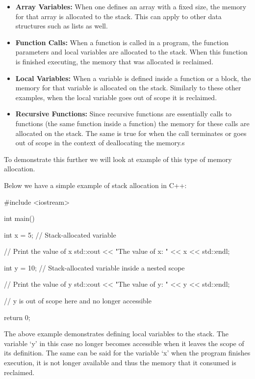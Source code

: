 \begin{itemize}
    \item \textbf{Array Variables:} When one defines an array with a fixed size, the memory for that array is allocated to the stack. This can apply to other data structures such as lists as well.
    \item \textbf{Function Calls:} When a function is called in a program, the function parameters and local variables are allocated to the stack. When this function is finished executing, the memory that
    was allocated is reclaimed.
    \item \textbf{Local Variables:} When a variable is defined inside a function or a block, the memory for that variable is allocated on the stack. Similarly to these other examples, when the local variable
    goes out of scope it is reclaimed.
    \item \textbf{Recursive Functions:} Since recursive functions are essentially calls to functions (the same function inside a function) the memory for these calls are allocated on the stack. The same is true
    for when the call terminates or goes out of scope in the context of deallocating the memory.s
\end{itemize}

\noindent To demonstrate this further we will look at example of this type of memory allocation.

\begin{highlight}

Below we have a simple example of stack allocation in C++:

\begin{code}
#include <iostream>

int main() {
    int x = 5;  // Stack-allocated variable

    // Print the value of x
    std::cout << "The value of x: " << x << std::endl;

    {
        int y = 10;  // Stack-allocated variable inside a nested scope

        // Print the value of y
        std::cout << "The value of y: " << y << std::endl;
    }

    // y is out of scope here and no longer accessible

    return 0;
}    
\end{code}

The above example demonstrates defining local variables to the stack. The variable `y' in this case no longer becomes accessible when it leaves the scope of its definition. The same can be said for
the variable `x' when the program finishes execution, it is not longer available and thus the memory that it consumed is reclaimed.

\end{highlight}

